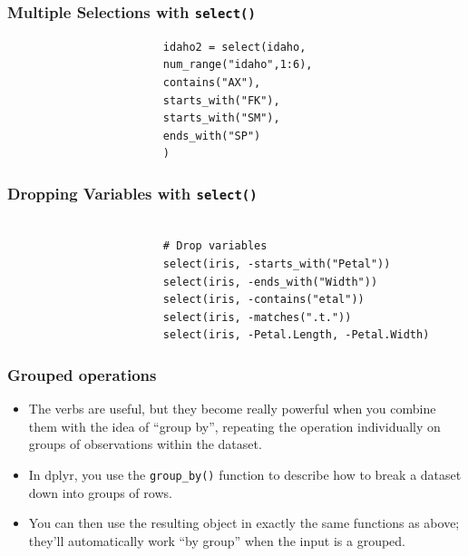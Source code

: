 \documentclass{beamer}
\begin{document}
				\begin{frame}[fragile]
					\frametitle{ Multiple Selections with \texttt{select()} }
					\begin{framed}
						\begin{verbatim}
						idaho2 = select(idaho,
						num_range("idaho",1:6),
						contains("AX"),
						starts_with("FK"),
						starts_with("SM"),
						ends_with("SP") 
						)
						\end{verbatim}
					\end{framed}
					
				\end{frame}
				\begin{frame}[fragile]
					\frametitle{ Dropping Variables with \texttt{select()} }
					\begin{framed}
						\begin{verbatim}	
						
						# Drop variables
						select(iris, -starts_with("Petal"))
						select(iris, -ends_with("Width"))
						select(iris, -contains("etal"))
						select(iris, -matches(".t."))
						select(iris, -Petal.Length, -Petal.Width)
						\end{verbatim}
					\end{framed}
					
				\end{frame}
				
	\begin{frame}
		\frametitle{Grouped operations}
		\begin{itemize}
			
			\item The verbs are useful, but they become really powerful when you combine them with the idea of “group by”, repeating the operation individually on groups of observations within the dataset. 
			\item In dplyr, you use the \texttt{group\_by()} function to describe how to break a dataset down into groups of rows. 
			\item You can then use the resulting object in exactly the same functions as above; they’ll automatically work “by group” when the input is a grouped.
		\end{itemize}
	\end{frame}
	
\end{document}
